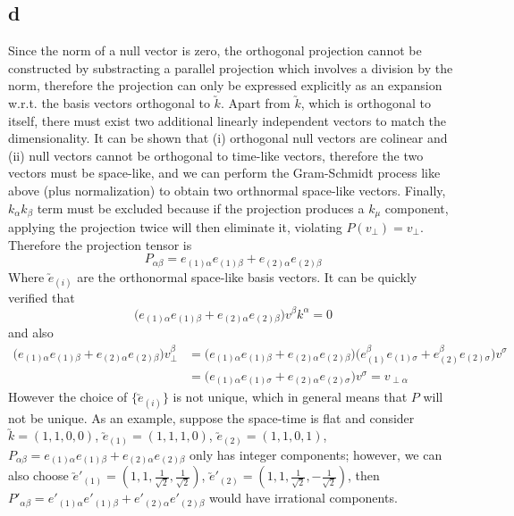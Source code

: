 \documentclass{article}
\begin{document}
\subsection*{d}
Since the norm of a null vector is zero, the orthogonal projection cannot be constructed by substracting a parallel projection which involves a division by the norm, therefore the projection can only be expressed explicitly as an expansion w.r.t. the basis vectors orthogonal to $\utilde{k}$. Apart from $\utilde{k}$, which is orthogonal to itself, there must exist two additional linearly independent vectors to match the dimensionality. It can be shown that (i) orthogonal null vectors are colinear and (ii) null vectors cannot be orthogonal to time-like vectors, therefore the two vectors must be space-like, and we can perform the Gram-Schmidt process like above (plus normalization) to obtain two orthnormal space-like vectors. Finally, $k_\alpha k_\beta$ term must be excluded because if the projection produces a $k_\mu$ component, applying the projection twice will then eliminate it, violating $P(v_\perp) = v_\perp$. Therefore the projection tensor is
\[ P_{\alpha\beta} = e_{(1)\alpha}e_{(1)\beta} + e_{(2)\alpha}e_{(2)\beta}\]
Where $\utilde{e}_{(i)}$ are the orthonormal space-like basis vectors. It can be quickly verified that
\[  \Big(e_{(1)\alpha}e_{(1)\beta} + e_{(2)\alpha}e_{(2)\beta}\Big) v^\beta k^\alpha = 0 \]
and also
\begin{align*}
\Big(e_{(1)\alpha}e_{(1)\beta} + e_{(2)\alpha}e_{(2)\beta}\Big)v_\perp^\beta
&=  \Big(e_{(1)\alpha}e_{(1)\beta} + e_{(2)\alpha}e_{(2)\beta}\Big)
	\Big(e_{(1)}^\beta e_{(1)\sigma} + e_{(2)}^\beta e_{(2)\sigma}\Big)v^\sigma  \\
&= \Big(e_{(1)\alpha} e_{(1)\sigma} + e_{(2)\alpha} e_{(2)\sigma}\Big)v^\sigma = v_{\perp\alpha}
\end{align*}
However the choice of $\{ \utilde{e}_{(i)} \}$ is not unique, which in general means that $P$ will not be unique. As an example, suppose the space-time is flat and consider $\utilde{k} = (1,1,0,0)$, $\utilde{e}_{(1)} = (1,1,1,0)$, $\utilde{e}_{(2)} = (1,1,0,1)$, $P_{\alpha\beta} = e_{(1)\alpha}e_{(1)\beta} + e_{(2)\alpha}e_{(2)\beta}$ only has integer components; however, we can also choose $\utilde{e}'_{(1)} = (1,1,\frac{1}{\sqrt{2}},\frac{1}{\sqrt{2}})$, $\utilde{e}'_{(2)} = (1,1, \frac{1}{\sqrt{2}},-\frac{1}{\sqrt{2}})$, then $P'_{\alpha\beta} = e'_{(1)\alpha}e'_{(1)\beta} + e'_{(2)\alpha}e'_{(2)\beta}$
would have irrational components.
\section{}
\end{document}
